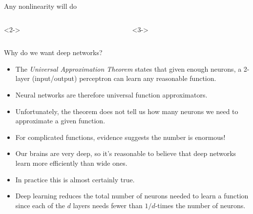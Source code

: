\documentclass[9pt]{beamer}
\begin{document}
\begin{frame}{Any nonlinearity will do}
\begin{columns}[T]
\pause
\begin{column}{0.3\textwidth}<2->
	\begin{center}
	\end{center}
\end{column}

\pause
\begin{column}{0.3\textwidth}<3->
	\begin{center}
	\end{center}
\end{column}

\end{columns}	
\end{frame}

\begin{frame}{Why do we want deep networks?}

\begin{itemize}
	\item The \emph{Universal Approximation Theorem} states that given enough neurons, a 2-layer (input/output) perceptron can learn any reasonable function.
	\item Neural networks are therefore universal function approximators.
\end{itemize}

\pause
\begin{itemize}
	\item Unfortunately, the theorem does not tell us how many neurons we need to approximate a given function.
	\item For complicated functions, evidence suggests the number is enormous!
\end{itemize}

\pause
\begin{itemize}
	\item Our brains are very deep, so it's reasonable to believe that deep networks learn more efficiently than wide ones.
	\item In practice this is almost certainly true.
	\item Deep learning reduces the total number of neurons needed to learn a function since each of the $d$ layers needs fewer than $1/d$-times the number of neurons.
\end{itemize}
	
\end{frame}
\end{document}
